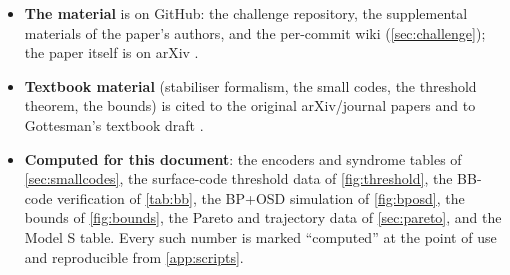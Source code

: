 \begin{itemize}[leftmargin=*]
  Iceberg Quantum's Pinnacle architecture \cite{pinnacle26} is included in \cref{tab:external-phys} as an arXiv paper, not as an established-company source.
\item \textbf{The \ecdsafail{} material} is on GitHub: the challenge repository, the supplemental materials of the paper's authors, and the per-commit wiki (\cref{sec:challenge}); the paper itself is on arXiv \cite{ecdsafail26}.
\item \textbf{Textbook material} (stabiliser formalism, the small codes, the threshold theorem, the bounds) is cited to the original arXiv/journal papers \cite{gottesman97,crss98,knill-laflamme97,aharonov-benor08,shor95,steane96,laflamme96,bennett96,kitaev03,dennis02} and to Gottesman's textbook draft \cite{gottesman24book}.
\item \textbf{Computed for this document}: the encoders and syndrome tables of \cref{sec:smallcodes}, the surface-code threshold data of \cref{fig:threshold}, the BB-code verification of \cref{tab:bb}, the BP+OSD simulation of \cref{fig:bposd}, the bounds of \cref{fig:bounds}, the Pareto and trajectory data of \cref{sec:pareto}, and the Model S table. Every such number is marked ``computed'' at the point of use and reproducible from \cref{app:scripts}.
\end{itemize}
